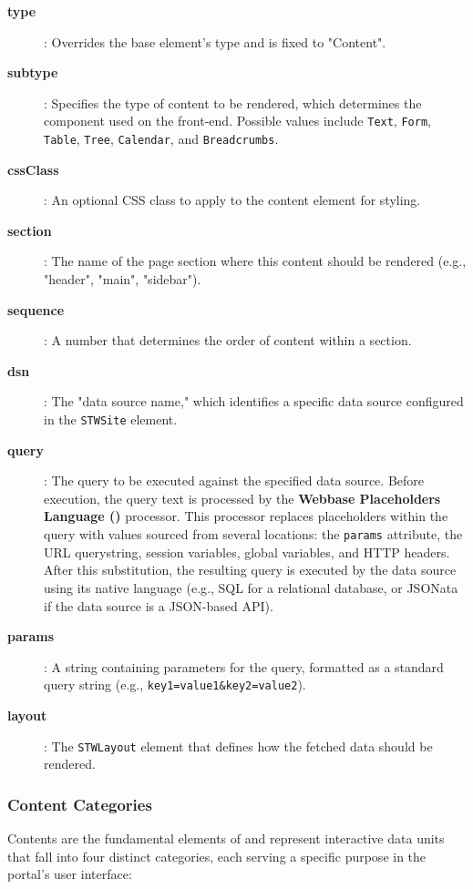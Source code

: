 \begin{description}
\item[\textbf{type}]: Overrides the base element's type and is fixed to "Content".
\item[\textbf{subtype}]: Specifies the type of content to be rendered, which determines the component used on the front-end. Possible values include \texttt{Text}, \texttt{Form}, \texttt{Table}, \texttt{Tree}, \texttt{Calendar}, and \texttt{Breadcrumbs}.
\item[\textbf{cssClass}]: An optional CSS class to apply to the content element for styling.
\item[\textbf{section}]: The name of the page section where this content should be rendered (e.g., "header", "main", "sidebar").
\item[\textbf{sequence}]: A number that determines the order of content within a section.
\item[\textbf{dsn}]: The "data source name," which identifies a specific data source configured in the \texttt{STWSite} element.
\item[\textbf{query}]: The query to be executed against the specified data source. Before execution, the query text is processed by the \textbf{Webbase Placeholders Language (\wbpl{})} processor. This processor replaces placeholders within the query with values sourced from several locations: the \texttt{params} attribute, the URL querystring, session variables, global variables, and HTTP headers. After this substitution, the resulting query is executed by the data source using its native language (e.g., SQL for a relational database, or JSONata if the data source is a JSON-based API).
\item[\textbf{params}]: A string containing parameters for the query, formatted as a standard query string (e.g., \texttt{key1=value1\&key2=value2}).
\item[\textbf{layout}]: The \texttt{STWLayout} element that defines how the fetched data should be rendered.
\end{description}

\subsubsection{Content Categories}
\label{sec:content-categories}

Contents are the fundamental elements of \wbdl{} and represent interactive data units that fall into four distinct categories, each serving a specific purpose in the portal's user interface:

